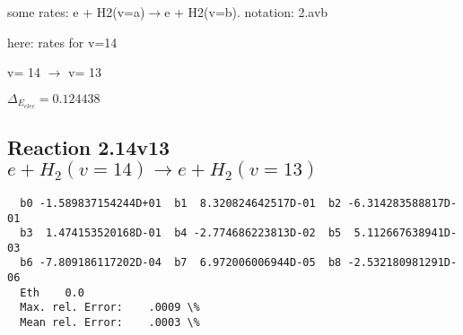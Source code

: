 \documentclass[12pt,dvipdfmx]{article}
\begin{document}
\newpage
some rates: e + H2(v=a)$\rightarrow$e + H2(v=b). notation: 2.avb

here: rates for v=14


  v=  14 $\rightarrow$ v= 13

$\Delta_{E_{elec}}= 0.124438$


\subsection{
Reaction 2.14v13
$ e + H_2(v=14) \rightarrow e + H_2(v=13) $
}


\begin{small}\begin{verbatim}
  b0 -1.589837154244D+01  b1  8.320824642517D-01  b2 -6.314283588817D-01
  b3  1.474153520168D-01  b4 -2.774686223813D-02  b5  5.112667638941D-03
  b6 -7.809186117202D-04  b7  6.972006006944D-05  b8 -2.532180981291D-06
  Eth    0.0
  Max. rel. Error:    .0009 \%
  Mean rel. Error:    .0003 \%

\end{verbatim}\end{small}

\newpage
\end{document}
